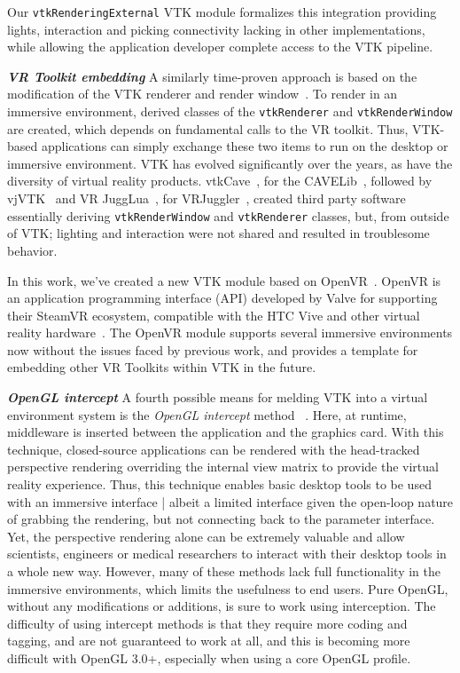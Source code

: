 Our \texttt{vtkRenderingExternal} VTK module formalizes this integration providing lights, interaction and picking connectivity lacking in other implementations, while allowing the application developer complete access to the VTK pipeline.

\textbf{\textit{VR Toolkit embedding}} A similarly time-proven approach is based on the modification of the VTK renderer and render window~\cite{van2000vista, Hannema:2001, Shamonin02vtkcave, Belleman:2003}. 
To render in an immersive environment, derived classes of the
\texttt{vtkRenderer} and \texttt{vtkRenderWindow} are created, which depends on fundamental calls to the VR toolkit.
Thus, VTK-based applications can simply exchange these two items to run on the desktop or immersive environment.
VTK has evolved significantly over the years, as have the diversity of virtual reality products.
vtkCave~\cite{Tufo:1999}, for the CAVELib~\cite{CAVELib:2016}, followed by
vjVTK~\cite{Blom:2006} and VR JuggLua~\cite{Pavlik:2012}, for
VRJuggler~\cite{Bierbaum:2001}, created third party software essentially
deriving \texttt{vtkRenderWindow} and \texttt{vtkRenderer} classes, but, from
outside of VTK; lighting and interaction were not shared and resulted in troublesome behavior.

In this work, we've created a new VTK module based on OpenVR~\cite{OpenVR:2016}.
OpenVR is an application programming interface (API) developed by Valve for supporting their SteamVR ecosystem, compatible with the HTC Vive and other virtual reality hardware~\cite{Road2VR:2015}.
The OpenVR module supports several immersive environments now without the issues faced by previous work, and provides a template for embedding other VR Toolkits within VTK in the future.

\textit{\textbf{OpenGL intercept}}
A fourth possible means for melding VTK into a virtual environment system
is the \textit{OpenGL intercept} method
~\cite{Humphreys:2001,Humphreys:2002,Zielinski:2014,TechViz:2016,Conduit:2016}.
Here, at runtime, middleware is inserted between the application and the graphics card.
With this technique, closed-source applications can be rendered with
the head-tracked perspective rendering overriding the internal view matrix
to provide the virtual reality experience.
Thus, this technique enables basic desktop tools to be used with an
immersive interface | albeit a limited interface given the open-loop nature of
grabbing the rendering, but not connecting back to the parameter interface.
Yet, the perspective rendering alone can be extremely valuable and allow
scientists, engineers or medical researchers to interact with their desktop
tools in a whole new way. However, many of these methods lack full functionality in the immersive environments, which limits the usefulness to end users.
Pure OpenGL, without any modifications or additions,  is sure to work using interception.
The difficulty of using intercept methods is that they require more coding
and tagging, and are not guaranteed to work at all, and this is becoming
more difficult with OpenGL 3.0+, especially when using a core OpenGL profile.

